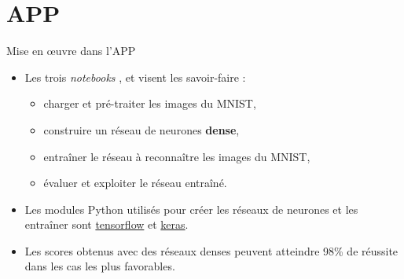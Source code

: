 \documentclass[10pt,serif,mathserif,compress,hyperref={colorlinks}]{beamer}
\begin{document}
\section{APP}

\begin{frame}{Mise en {\oe}uvre dans l'APP}

  \begin{tcolorbox}[title=Étape 1 -- Auto-formation / Réseau dense]
    \begin{itemize}
    \item Les trois {\em notebooks} ,  et  visent les savoir-faire :
      \begin{itemize}
      \item charger et pré-traiter les images du MNIST,
      \item construire un réseau de neurones {\bf dense},
      \item entraîner le réseau à reconnaître les images du MNIST,
      \item évaluer et exploiter le réseau entraîné.
      \end{itemize}
      
    \item Les modules Python utilisés pour créer les réseaux de neurones et les entraîner sont \href{https://www.tensorflow.org/tutorials}{tensorflow}
      et \href{https://www.tensorflow.org/versions/r2.4/api_docs/python/tf}{keras}.
    \item Les scores obtenus avec des réseaux denses peuvent atteindre 98\% de réussite dans les cas les plus favorables.
    \end{itemize}
  \end{tcolorbox}

\end{frame}
\end{document}
